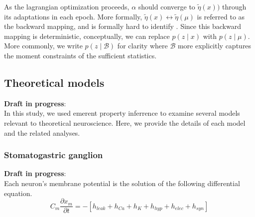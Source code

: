 \documentclass[11pt]{article}
\begin{document}
As the lagrangian optimization proceeds, $\alpha$ should converge to $\tilde{\eta}(x))$ through its adaptations in each epoch.  More formally, $\tilde{\eta}(x) \leftrightarrow \tilde{\eta}(\mu)$ is referred to as the backward mapping, and is formally hard to identify \cite{wainwright2008graphical}.  Since this backward mapping is deterministic, conceptually, we can replace $p(z \mid x)$ with $p(z \mid \mu)$.  More commonly, we write $p(z \mid \mathcal{B})$ for clarity where $\mathcal{B}$ more explicitly captures the moment constraints of the sufficient statistics.

\subsection{Theoretical models}\label{methods_theoretical_models}
\textbf{Draft in progress}: \\
In this study, we used emerent property inferrence to examine several models relevant to theoretical neuroscience.  Here, we provide the details of each model  and the related analyses.

\subsubsection{Stomatogastric ganglion}\label{methods_STG}
\textbf{Draft in progress}: \\
Each neuron's membrane potential is the solution of the following differential equation.
\begin{equation} C_m \frac{\partial x_m}{\partial t} = - \left[ h_{leak} + h_{Ca} + h_K + h_{hyp} + h_{elec} + h_{syn}\right] 
\end{equation} 
\end{document}
